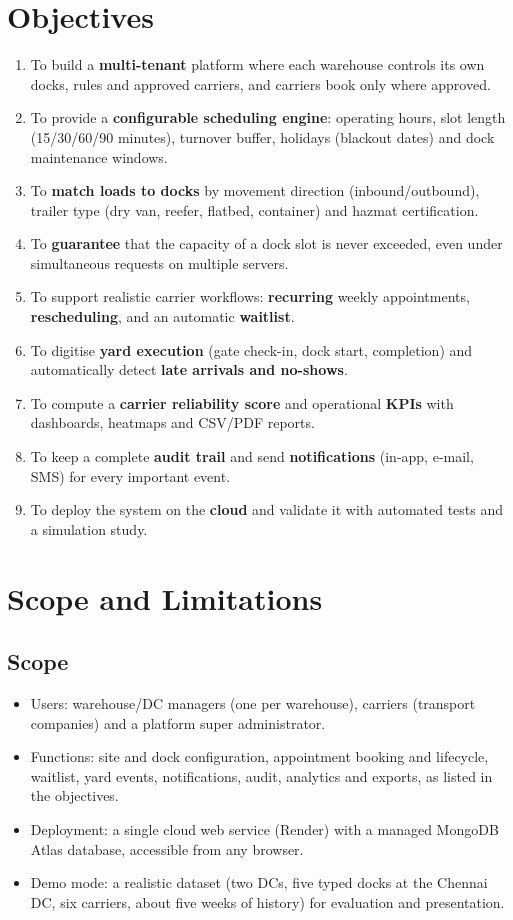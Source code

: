 \section{Objectives}
\begin{enumerate}
  \item To build a \textbf{multi-tenant} platform where each warehouse controls its own docks, rules and approved carriers, and carriers book only where approved.
  \item To provide a \textbf{configurable scheduling engine}: operating hours, slot length (15/30/60/90 minutes), turnover buffer, holidays (blackout dates) and dock maintenance windows.
  \item To \textbf{match loads to docks} by movement direction (inbound/outbound), trailer type (dry van, reefer, flatbed, container) and hazmat certification.
  \item To \textbf{guarantee} that the capacity of a dock slot is never exceeded, even under simultaneous requests on multiple servers.
  \item To support realistic carrier workflows: \textbf{recurring} weekly appointments, \textbf{rescheduling}, and an automatic \textbf{waitlist}.
  \item To digitise \textbf{yard execution} (gate check-in, dock start, completion) and automatically detect \textbf{late arrivals and no-shows}.
  \item To compute a \textbf{carrier reliability score} and operational \textbf{KPIs} with dashboards, heatmaps and CSV/PDF reports.
  \item To keep a complete \textbf{audit trail} and send \textbf{notifications} (in-app, e-mail, SMS) for every important event.
  \item To deploy the system on the \textbf{cloud} and validate it with automated tests and a simulation study.
\end{enumerate}

\section{Scope and Limitations}
\subsection*{Scope}
\begin{itemize}
  \item Users: warehouse/DC managers (one per warehouse), carriers (transport companies) and a platform super administrator.
  \item Functions: site and dock configuration, appointment booking and lifecycle, waitlist, yard events, notifications, audit, analytics and exports, as listed in the objectives.
  \item Deployment: a single cloud web service (Render) with a managed MongoDB Atlas database, accessible from any browser.
  \item Demo mode: a realistic dataset (two DCs, five typed docks at the Chennai DC, six carriers, about five weeks of history) for evaluation and presentation.
\end{itemize}

